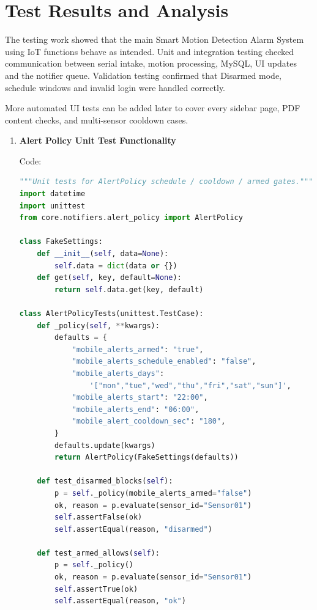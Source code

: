 \documentclass[12pt,a4paper]{report}
\begin{document}
\section{Test Results and Analysis}

The testing work showed that the main Smart Motion Detection Alarm System using IoT functions behave as intended. Unit and integration testing checked communication between serial intake, motion processing, MySQL, UI updates and the notifier queue. Validation testing confirmed that Disarmed mode, schedule windows and invalid login were handled correctly.

More automated UI tests can be added later to cover every sidebar page, PDF content checks, and multi-sensor cooldown cases.

\begin{enumerate}

\item\textbf{Alert Policy Unit Test Functionality}

{Code:}

\begin{lstlisting}[language=Python, numbers=none,basicstyle=\footnotesize\ttfamily,
xleftmargin=0cm, linewidth=\textwidth]
"""Unit tests for AlertPolicy schedule / cooldown / armed gates."""
import datetime
import unittest
from core.notifiers.alert_policy import AlertPolicy

class FakeSettings:
    def __init__(self, data=None):
        self.data = dict(data or {})
    def get(self, key, default=None):
        return self.data.get(key, default)

class AlertPolicyTests(unittest.TestCase):
    def _policy(self, **kwargs):
        defaults = {
            "mobile_alerts_armed": "true",
            "mobile_alerts_schedule_enabled": "false",
            "mobile_alerts_days":
                '["mon","tue","wed","thu","fri","sat","sun"]',
            "mobile_alerts_start": "22:00",
            "mobile_alerts_end": "06:00",
            "mobile_alert_cooldown_sec": "180",
        }
        defaults.update(kwargs)
        return AlertPolicy(FakeSettings(defaults))

    def test_disarmed_blocks(self):
        p = self._policy(mobile_alerts_armed="false")
        ok, reason = p.evaluate(sensor_id="Sensor01")
        self.assertFalse(ok)
        self.assertEqual(reason, "disarmed")

    def test_armed_allows(self):
        p = self._policy()
        ok, reason = p.evaluate(sensor_id="Sensor01")
        self.assertTrue(ok)
        self.assertEqual(reason, "ok")
\end{lstlisting}


\end{enumerate}
\end{document}
